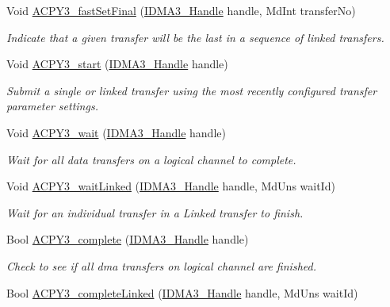 \begin{CompactItemize}
Void \hyperlink{group___d_s_p_a_c_p_y3_g44f2ce173d41bc7bbfb6e7fb500ec58f}{ACPY3\_\-fast\-Set\-Final} (\hyperlink{struct_i_d_m_a3___obj}{IDMA3\_\-Handle} handle, Md\-Int transfer\-No)
\begin{CompactList}\small\item\em Indicate that a given transfer will be the last in a sequence of linked transfers. \item\end{CompactList}\item 
Void \hyperlink{group___d_s_p_a_c_p_y3_gb4102200f00a9df3961a8374c0042bed}{ACPY3\_\-start} (\hyperlink{struct_i_d_m_a3___obj}{IDMA3\_\-Handle} handle)
\begin{CompactList}\small\item\em Submit a single or linked transfer using the most recently configured transfer parameter settings. \item\end{CompactList}\item 
Void \hyperlink{group___d_s_p_a_c_p_y3_g499bc0643a52f5cfd0828c1ce21cd69b}{ACPY3\_\-wait} (\hyperlink{struct_i_d_m_a3___obj}{IDMA3\_\-Handle} handle)
\begin{CompactList}\small\item\em Wait for all data transfers on a logical channel to complete. \item\end{CompactList}\item 
Void \hyperlink{group___d_s_p_a_c_p_y3_g6acf0b26cee48d5cbc81e2c9049128ea}{ACPY3\_\-wait\-Linked} (\hyperlink{struct_i_d_m_a3___obj}{IDMA3\_\-Handle} handle, Md\-Uns wait\-Id)
\begin{CompactList}\small\item\em Wait for an individual transfer in a Linked transfer to finish. \item\end{CompactList}\item 
Bool \hyperlink{group___d_s_p_a_c_p_y3_ge22deca1f6878a359a619cff8654d9de}{ACPY3\_\-complete} (\hyperlink{struct_i_d_m_a3___obj}{IDMA3\_\-Handle} handle)
\begin{CompactList}\small\item\em Check to see if all dma transfers on logical channel are finished. \item\end{CompactList}\item 
Bool \hyperlink{group___d_s_p_a_c_p_y3_g88a22e18670a97816b27dcd90abf2ae9}{ACPY3\_\-complete\-Linked} (\hyperlink{struct_i_d_m_a3___obj}{IDMA3\_\-Handle} handle, Md\-Uns wait\-Id)

\end{CompactItemize}
